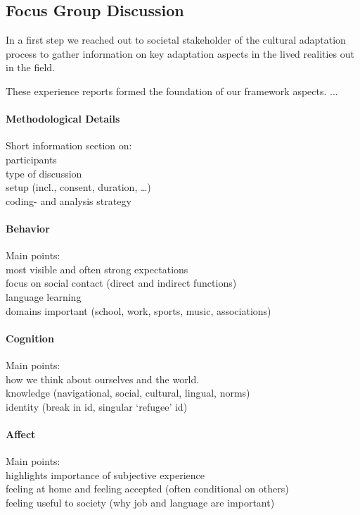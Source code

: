 \documentclass[nobib]{tufte-handout}
\begin{document}
\subsection{Focus Group Discussion}
In a first step we reached out to societal stakeholder of the cultural adaptation process to gather information on key adaptation aspects in the lived realities out in the field.

These experience reports formed the foundation of our framework aspects. ...

\paragraph{Methodological Details} Short information section on: \\
participants\\
type of discussion\\
setup (incl., consent, duration, …)\\
coding- and analysis strategy

\paragraph{Behavior} Main points:\\
most visible and often strong expectations\\
focus on social contact (direct and indirect functions) \\
language learning \\
domains important (school, work, sports, music, associations) \\

\paragraph{Cognition} Main points:\\
how we think about ourselves and the world.\\
knowledge (navigational, social, cultural, lingual, norms)\\
identity (break in id, singular ‘refugee' id)\\

\paragraph{Affect} Main points:\\
highlights importance of subjective experience\\
feeling at home and feeling accepted (often conditional on others)\\
feeling useful to society (why job and language are important)\\
\end{document}
